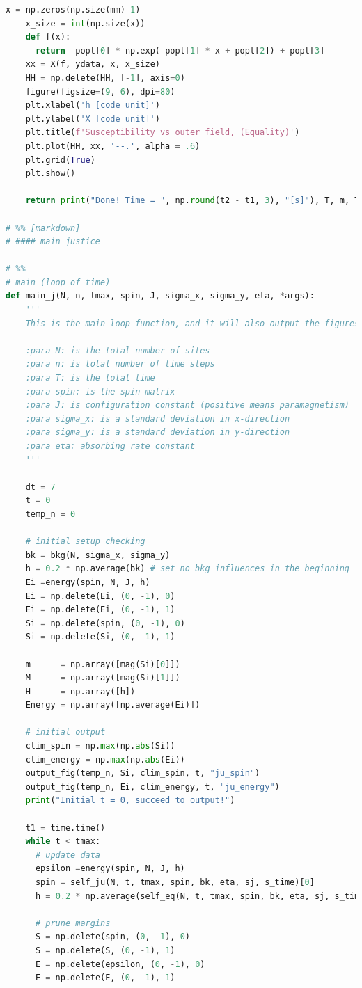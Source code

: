 \documentclass[10pt]{article}
\begin{document}
\begin{lstlisting}[language={Python}]
    x = np.zeros(np.size(mm)-1)
    x_size = int(np.size(x))
    def f(x):
      return -popt[0] * np.exp(-popt[1] * x + popt[2]) + popt[3]
    xx = X(f, ydata, x, x_size)
    HH = np.delete(HH, [-1], axis=0)
    figure(figsize=(9, 6), dpi=80)
    plt.xlabel('h [code unit]')
    plt.ylabel('X [code unit]')
    plt.title(f'Susceptibility vs outer field, (Equality)')
    plt.plot(HH, xx, '--.', alpha = .6)
    plt.grid(True)
    plt.show()
    
    return print("Done! Time = ", np.round(t2 - t1, 3), "[s]"), T, m, T, Energy

# %% [markdown]
# #### main justice

# %%
# main (loop of time)
def main_j(N, n, tmax, spin, J, sigma_x, sigma_y, eta, *args):
    '''
    This is the main loop function, and it will also output the figures(.png).

    :para N: is the total number of sites
    :para n: is total number of time steps
    :para T: is the total time
    :para spin: is the spin matrix
    :para J: is configuration constant (positive means paramagnetism)
    :para sigma_x: is a standard deviation in x-direction
    :para sigma_y: is a standard deviation in y-direction
    :para eta: absorbing rate constant
    '''

    dt = 7
    t = 0
    temp_n = 0
    
    # initial setup checking 
    bk = bkg(N, sigma_x, sigma_y)
    h = 0.2 * np.average(bk) # set no bkg influences in the beginning
    Ei =energy(spin, N, J, h)
    Ei = np.delete(Ei, (0, -1), 0)
    Ei = np.delete(Ei, (0, -1), 1)
    Si = np.delete(spin, (0, -1), 0)
    Si = np.delete(Si, (0, -1), 1)
    
    m      = np.array([mag(Si)[0]])
    M      = np.array([mag(Si)[1]])
    H      = np.array([h])
    Energy = np.array([np.average(Ei)])
    
    # initial output
    clim_spin = np.max(np.abs(Si))
    clim_energy = np.max(np.abs(Ei))
    output_fig(temp_n, Si, clim_spin, t, "ju_spin")
    output_fig(temp_n, Ei, clim_energy, t, "ju_energy")
    print("Initial t = 0, succeed to output!")

    t1 = time.time()
    while t < tmax:
      # update data
      epsilon =energy(spin, N, J, h)
      spin = self_ju(N, t, tmax, spin, bk, eta, sj, s_time)[0]
      h = 0.2 * np.average(self_eq(N, t, tmax, spin, bk, eta, sj, s_time)[1])
      
      # prune margins
      S = np.delete(spin, (0, -1), 0)
      S = np.delete(S, (0, -1), 1)
      E = np.delete(epsilon, (0, -1), 0)
      E = np.delete(E, (0, -1), 1)
      

\end{lstlisting}
\end{document}
